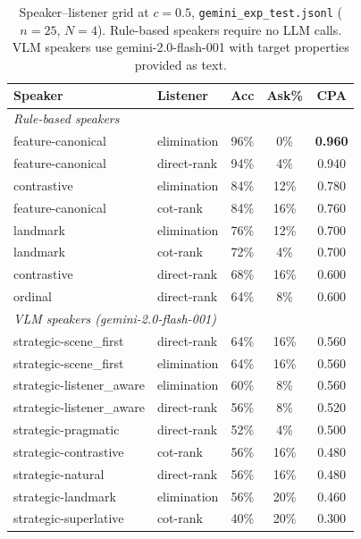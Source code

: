 \documentclass[11pt]{article}
\begin{document}
\begin{table}[h]
\centering
\small
\begin{tabular}{llccc}
\toprule
Speaker & Listener & Acc & Ask\% & CPA \\
\midrule
\multicolumn{5}{l}{\textit{Rule-based speakers}} \\
feature-canonical  & elimination  & 96\% &  0\% & \textbf{0.960} \\
feature-canonical  & direct-rank  & 94\% &  4\% & 0.940 \\
contrastive        & elimination  & 84\% & 12\% & 0.780 \\
feature-canonical  & cot-rank     & 84\% & 16\% & 0.760 \\
landmark           & elimination  & 76\% & 12\% & 0.700 \\
landmark           & cot-rank     & 72\% &  4\% & 0.700 \\
contrastive        & direct-rank  & 68\% & 16\% & 0.600 \\
ordinal            & direct-rank  & 64\% &  8\% & 0.600 \\
\midrule
\multicolumn{5}{l}{\textit{VLM speakers (gemini-2.0-flash-001)}} \\
strategic-scene\_first    & direct-rank  & 64\% & 16\% & 0.560 \\
strategic-scene\_first    & elimination  & 64\% & 16\% & 0.560 \\
strategic-listener\_aware & elimination  & 60\% &  8\% & 0.560 \\
strategic-listener\_aware & direct-rank  & 56\% &  8\% & 0.520 \\
strategic-pragmatic       & direct-rank  & 52\% &  4\% & 0.500 \\
strategic-contrastive     & cot-rank     & 56\% & 16\% & 0.480 \\
strategic-natural         & direct-rank  & 56\% & 16\% & 0.480 \\
strategic-landmark        & elimination  & 56\% & 20\% & 0.460 \\
strategic-superlative     & cot-rank     & 40\% & 20\% & 0.300 \\
\bottomrule
\end{tabular}
\caption{Speaker--listener grid at $c{=}0.5$, \texttt{gemini\_exp\_test.jsonl}
         ($n{=}25$, $N{=}4$).  Rule-based speakers require no LLM calls.
         VLM speakers use gemini-2.0-flash-001 with target properties provided as text.}
\label{tab:phase2}
\end{table}
\end{document}
